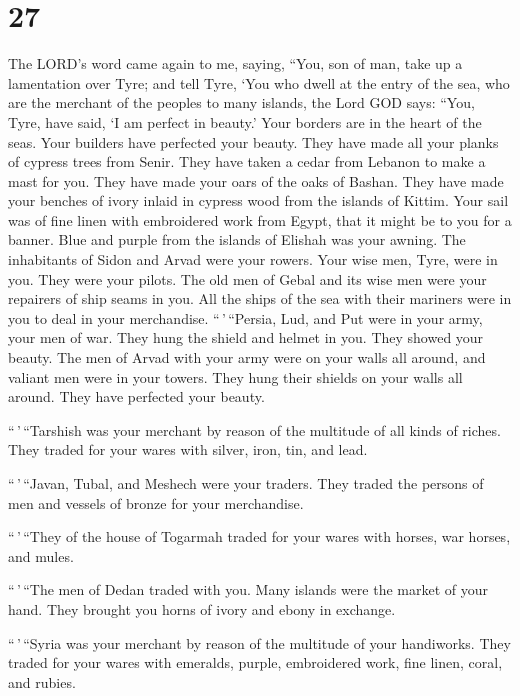 \hypertarget{section-25}{%
\section{27}\label{section-25}}

 The LORD's word came again to me, saying, 
``You, son of man, take up a lamentation over Tyre;  and
tell Tyre, `You who dwell at the entry of the sea, who are the merchant
of the peoples to many islands, the Lord GOD says: ``You, Tyre, have
said, `I am perfect in beauty.'  Your borders are in the
heart of the seas. Your builders have perfected your beauty.
 They have made all your planks of cypress trees from
Senir. They have taken a cedar from Lebanon to make a mast for you.
 They have made your oars of the oaks of Bashan. They have
made your benches of ivory inlaid in cypress wood from the islands of
Kittim.  Your sail was of fine linen with embroidered work
from Egypt, that it might be to you for a banner. Blue and purple from
the islands of Elishah was your awning.  The inhabitants
of Sidon and Arvad were your rowers. Your wise men, Tyre, were in you.
They were your pilots.  The old men of Gebal and its wise
men were your repairers of ship seams in you. All the ships of the sea
with their mariners were in you to deal in your merchandise.
 ``\,'\,``Persia, Lud, and Put were in your army, your
men of war. They hung the shield and helmet in you. They showed your
beauty.  The men of Arvad with your army were on your
walls all around, and valiant men were in your towers. They hung their
shields on your walls all around. They have perfected your beauty.

 ``\,'\,``Tarshish was your merchant by reason of the
multitude of all kinds of riches. They traded for your wares with
silver, iron, tin, and lead.

 ``\,'\,``Javan, Tubal, and Meshech were your traders.
They traded the persons of men and vessels of bronze for your
merchandise.

 ``\,'\,``They of the house of Togarmah traded for your
wares with horses, war horses, and mules.

 ``\,'\,``The men of Dedan traded with you. Many islands
were the market of your hand. They brought you horns of ivory and ebony
in exchange.

 ``\,'\,``Syria was your merchant by reason of the
multitude of your handiworks. They traded for your wares with emeralds,
purple, embroidered work, fine linen, coral, and rubies.

